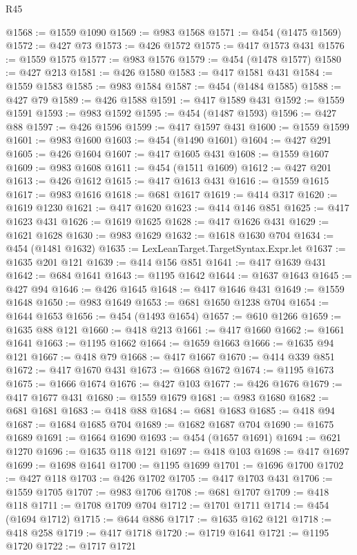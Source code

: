 \begin{lexlean}{R45}
\begin{coremodule}
@1568 := @1559 @1090
@1569 := @983 @1568
@1571 := @454 (@1475 @1569)
@1572 := @427 @73
@1573 := @426 @1572
@1575 := @417 @1573 @431
@1576 := @1559 @1575
@1577 := @983 @1576
@1579 := @454 (@1478 @1577)
@1580 := @427 @213
@1581 := @426 @1580
@1583 := @417 @1581 @431
@1584 := @1559 @1583
@1585 := @983 @1584
@1587 := @454 (@1484 @1585)
@1588 := @427 @79
@1589 := @426 @1588
@1591 := @417 @1589 @431
@1592 := @1559 @1591
@1593 := @983 @1592
@1595 := @454 (@1487 @1593)
@1596 := @427 @88
@1597 := @426 @1596
@1599 := @417 @1597 @431
@1600 := @1559 @1599
@1601 := @983 @1600
@1603 := @454 (@1490 @1601)
@1604 := @427 @291
@1605 := @426 @1604
@1607 := @417 @1605 @431
@1608 := @1559 @1607
@1609 := @983 @1608
@1611 := @454 (@1511 @1609)
@1612 := @427 @201
@1613 := @426 @1612
@1615 := @417 @1613 @431
@1616 := @1559 @1615
@1617 := @983 @1616
@1618 := @681 @1617
@1619 := @414 @317
@1620 := @1619 @1230
@1621 := @417 @1620
@1623 := @414 @146 @851
@1625 := @417 @1623 @431
@1626 := @1619 @1625
@1628 := @417 @1626 @431
@1629 := @1621 @1628
@1630 := @983 @1629
@1632 := @1618 @1630 @704
@1634 := @454 (@1481 @1632)
@1635 := LexLeanTarget.TargetSyntax.Expr.let
@1637 := @1635 @201 @121
@1639 := @414 @156 @851
@1641 := @417 @1639 @431
@1642 := @684 @1641
@1643 := @1195 @1642
@1644 := @1637 @1643
@1645 := @427 @94
@1646 := @426 @1645
@1648 := @417 @1646 @431
@1649 := @1559 @1648
@1650 := @983 @1649
@1653 := @681 @1650 @1238 @704
@1654 := @1644 @1653
@1656 := @454 (@1493 @1654)
@1657 := @610 @1266
@1659 := @1635 @88 @121
@1660 := @418 @213
@1661 := @417 @1660
@1662 := @1661 @1641
@1663 := @1195 @1662
@1664 := @1659 @1663
@1666 := @1635 @94 @121
@1667 := @418 @79
@1668 := @417 @1667
@1670 := @414 @339 @851
@1672 := @417 @1670 @431
@1673 := @1668 @1672
@1674 := @1195 @1673
@1675 := @1666 @1674
@1676 := @427 @103
@1677 := @426 @1676
@1679 := @417 @1677 @431
@1680 := @1559 @1679
@1681 := @983 @1680
@1682 := @681 @1681
@1683 := @418 @88
@1684 := @681 @1683
@1685 := @418 @94
@1687 := @1684 @1685 @704
@1689 := @1682 @1687 @704
@1690 := @1675 @1689
@1691 := @1664 @1690
@1693 := @454 (@1657 @1691)
@1694 := @621 @1270
@1696 := @1635 @118 @121
@1697 := @418 @103
@1698 := @417 @1697
@1699 := @1698 @1641
@1700 := @1195 @1699
@1701 := @1696 @1700
@1702 := @427 @118
@1703 := @426 @1702
@1705 := @417 @1703 @431
@1706 := @1559 @1705
@1707 := @983 @1706
@1708 := @681 @1707
@1709 := @418 @118
@1711 := @1708 @1709 @704
@1712 := @1701 @1711
@1714 := @454 (@1694 @1712)
@1715 := @644 @886
@1717 := @1635 @162 @121
@1718 := @418 @258
@1719 := @417 @1718
@1720 := @1719 @1641
@1721 := @1195 @1720
@1722 := @1717 @1721

\end{coremodule}
\end{lexlean}
